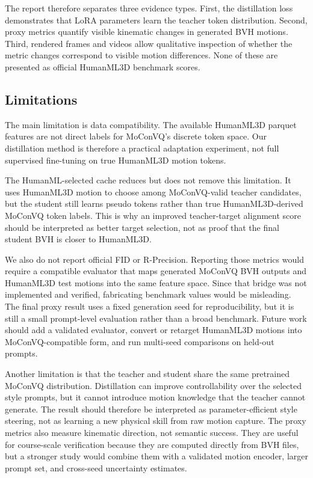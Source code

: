 \documentclass[conference]{IEEEtran}
\begin{document}
The report therefore separates three evidence types. First, the distillation loss demonstrates that LoRA parameters learn the teacher token distribution. Second, proxy metrics quantify visible kinematic changes in generated BVH motions. Third, rendered frames and videos allow qualitative inspection of whether the metric changes correspond to visible motion differences. None of these are presented as official HumanML3D benchmark scores.

\subsection{Limitations}
The main limitation is data compatibility. The available HumanML3D parquet features are not direct labels for MoConVQ's discrete token space. Our distillation method is therefore a practical adaptation experiment, not full supervised fine-tuning on true HumanML3D motion tokens.

The HumanML-selected cache reduces but does not remove this limitation. It uses HumanML3D motion to choose among MoConVQ-valid teacher candidates, but the student still learns pseudo tokens rather than true HumanML3D-derived MoConVQ token labels. This is why an improved teacher-target alignment score should be interpreted as better target selection, not as proof that the final student BVH is closer to HumanML3D.

We also do not report official FID or R-Precision. Reporting those metrics would require a compatible evaluator that maps generated MoConVQ BVH outputs and HumanML3D test motions into the same feature space. Since that bridge was not implemented and verified, fabricating benchmark values would be misleading. The final proxy result uses a fixed generation seed for reproducibility, but it is still a small prompt-level evaluation rather than a broad benchmark. Future work should add a validated evaluator, convert or retarget HumanML3D motions into MoConVQ-compatible form, and run multi-seed comparisons on held-out prompts.

Another limitation is that the teacher and student share the same pretrained MoConVQ distribution. Distillation can improve controllability over the selected style prompts, but it cannot introduce motion knowledge that the teacher cannot generate. The result should therefore be interpreted as parameter-efficient style steering, not as learning a new physical skill from raw motion capture. The proxy metrics also measure kinematic direction, not semantic success. They are useful for course-scale verification because they are computed directly from BVH files, but a stronger study would combine them with a validated motion encoder, larger prompt set, and cross-seed uncertainty estimates.
\end{document}
